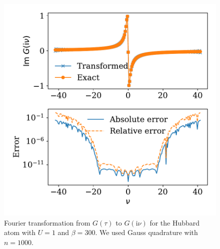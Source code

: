 \documentclass[submission, LectureNotes]{SciPost}
\newcommand\ii{\mathrm{i}}%
\newcommand\iv{\ii\nu}%
\begin{document}
\begin{figure}
    \centering
    \includegraphics[width=0.8\columnwidth]{fourier_transform_hubbard_atom.pdf}
    \caption{
        Fourier transformation from $G(\tau)$ to $G(\iv)$ for the Hubbard atom with $U=1$ and $\beta=300$.
        We used Gauss quadrature with $n=1000$.
        }
    \label{fig:fourier-transform-hubbard-atom}
\end{figure}

\end{document}
